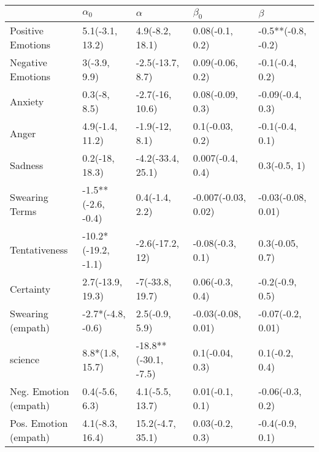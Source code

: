 \begin{tabular}{lllll}
\toprule
{} &           $\alpha_0$ &              $\alpha$ &            $\beta_0$ &             $\beta$ \\
\midrule
Positive Emotions     &      5.1(-3.1, 13.2) &       4.9(-8.2, 18.1) &      0.08(-0.1, 0.2) &  -0.5**(-0.8, -0.2) \\
Negative Emotions     &         3(-3.9, 9.9) &      -2.5(-13.7, 8.7) &     0.09(-0.06, 0.2) &     -0.1(-0.4, 0.2) \\
Anxiety               &         0.3(-8, 8.5) &       -2.7(-16, 10.6) &     0.08(-0.09, 0.3) &    -0.09(-0.4, 0.3) \\
Anger                 &      4.9(-1.4, 11.2) &        -1.9(-12, 8.1) &      0.1(-0.03, 0.2) &     -0.1(-0.4, 0.1) \\
Sadness               &       0.2(-18, 18.3) &     -4.2(-33.4, 25.1) &     0.007(-0.4, 0.4) &        0.3(-0.5, 1) \\
Swearing Terms        &   -1.5**(-2.6, -0.4) &        0.4(-1.4, 2.2) &  -0.007(-0.03, 0.02) &  -0.03(-0.08, 0.01) \\
Tentativeness         &  -10.2*(-19.2, -1.1) &       -2.6(-17.2, 12) &     -0.08(-0.3, 0.1) &     0.3(-0.05, 0.7) \\
Certainty             &     2.7(-13.9, 19.3) &       -7(-33.8, 19.7) &      0.06(-0.3, 0.4) &     -0.2(-0.9, 0.5) \\
Swearing (empath)     &    -2.7*(-4.8, -0.6) &        2.5(-0.9, 5.9) &   -0.03(-0.08, 0.01) &   -0.07(-0.2, 0.01) \\
science               &      8.8*(1.8, 15.7) &  -18.8**(-30.1, -7.5) &      0.1(-0.04, 0.3) &      0.1(-0.2, 0.4) \\
Neg. Emotion (empath) &       0.4(-5.6, 6.3) &       4.1(-5.5, 13.7) &      0.01(-0.1, 0.1) &    -0.06(-0.3, 0.2) \\
Pos. Emotion (empath) &      4.1(-8.3, 16.4) &      15.2(-4.7, 35.1) &      0.03(-0.2, 0.3) &     -0.4(-0.9, 0.1) \\
\bottomrule
\end{tabular}
